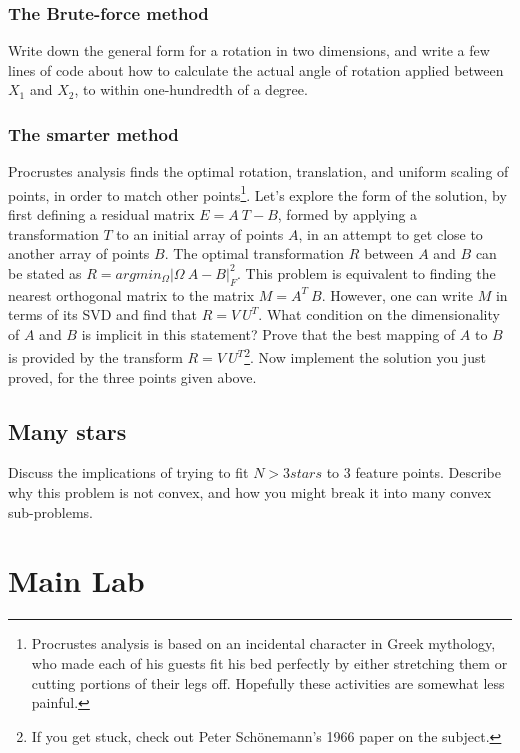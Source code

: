 \documentclass{article}
\begin{document}
\subsubsection{The Brute-force method}

Write down the general form for a rotation in two dimensions, and write a few lines of code about how to calculate the actual angle of rotation applied between $X_1$ and $X_2$, to within one-hundredth of a degree. 

\subsubsection{The smarter method}

Procrustes analysis finds the optimal rotation, translation, and uniform scaling of points, in order to match other points\footnote{Procrustes analysis is based on an incidental character in Greek mythology, who made each of his guests fit his bed perfectly by either stretching them or cutting portions of their legs off. Hopefully these activities are somewhat less painful.}. Let's explore the form of the solution, by first defining a residual matrix $E = A~T - B$, formed by applying a transformation $T$ to an initial array of points $A$, in an attempt to get close to another array of points $B$. The optimal transformation $R$ between $A$ and $B$ can be stated as $R = argmin_{\Omega} |\Omega~A - B|_F^2$. This problem is equivalent to finding the nearest orthogonal matrix to the matrix $M=A^T ~ B$. However, one can write $M$ in terms of its SVD and find that $R = V ~ U^T$. What condition on the dimensionality of $A$ and $B$ is implicit in this statement?
Prove that the best mapping of $A$ to $B$ is provided by the transform $R = V ~ U^T$\footnote{If you get stuck, check out Peter Sch\"onemann's 1966 paper on the subject.}. Now implement the solution you just proved, for the three points given above.

\subsection{Many stars}

Discuss the implications of trying to fit $N > 3 stars$ to 3 feature points. Describe why this problem is not convex, and how you might break it into many convex sub-problems.

\section{Main Lab}
\end{document}

